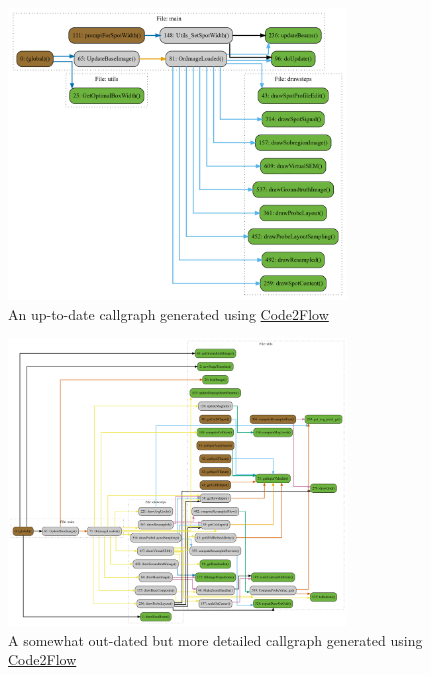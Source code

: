 \documentclass[12pt, titlepage]{article}
\begin{document}
\begin{figure}[h!]
  \begin{center}
   \includegraphics[width=0.8\textwidth]{callgraph/simple.png}
  \caption{An up-to-date callgraph generated using \href{https://github.com/scottrogowski/code2flow}{Code2Flow}}
  \label{fig_callgraph_simple} 
  \end{center}
\end{figure}

\begin{figure}[h!]
  \begin{center}
   \includegraphics[width=0.8\textwidth]{callgraph/old-complex.png}
  \caption{A somewhat out-dated but more detailed callgraph generated using \href{https://github.com/scottrogowski/code2flow}{Code2Flow}}
  \label{fig_callgraph_old_full} 
  \end{center}
\end{figure}

\newpage
\clearpage



\end{document}
